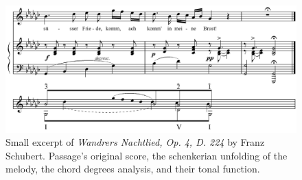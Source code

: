 
\begin{figure}[ht]
\includegraphics[clip,width=\columnwidth]{figures/schenkerian analysis/SchubertOp4no3.png}%
\caption[Excerpt of \textit{Wandrers Nachtlied, Op. 4, D. 224} by Franz Schubert.]{\small{Small excerpt of \textit{Wandrers Nachtlied, Op. 4, D. 224} by Franz Schubert. Passage's original score, the schenkerian unfolding of the melody, the chord degrees analysis, and their tonal function.}}
\label{fig:Wandrers Nachtlied, Op. 4, D. 224}
\end{figure}